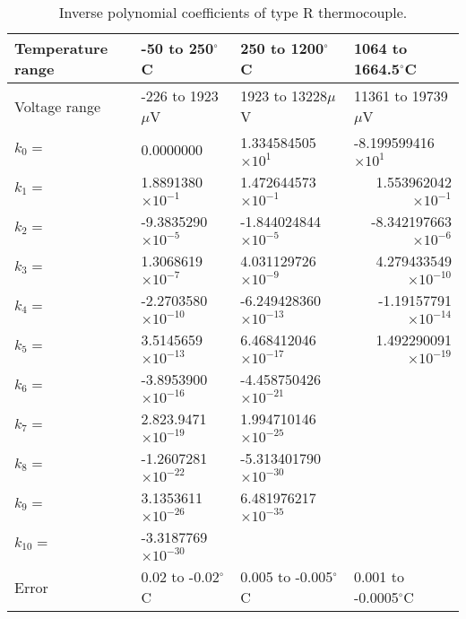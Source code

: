 \begin{table}[ht]
  \centering
  \small
  \caption{Inverse polynomial coefficients of type R thermocouple.}
    \begin{tabular}{lllr}
    \toprule
    Temperature range & -50 to 250$^{\circ}$C & 250 to 1200$^{\circ}$C & \multicolumn{1}{l}{1064 to 1664.5$^{\circ}$C} \\
    \midrule
    Voltage range & -226 to 1923$\mu$V & 1923 to 13228$\mu$V & \multicolumn{1}{l}{11361 to 19739$\mu$V} \\
    \midrule
    $k_{0}=$ & 0.0000000 & 1.334584505$\times 10^{1}$ & \multicolumn{1}{l}{-8.199599416$\times 10^{1}$} \\
    $k_{1}=$ & 1.8891380$\times 10^{-1}$ & 1.472644573$\times 10^{-1}$ & 1.553962042$\times 10^{-1}$ \\
    $k_{2}=$ & -9.3835290$\times 10^{-5}$ & -1.844024844$\times 10^{-5}$ & -8.342197663$\times 10^{-6}$ \\
    $k_{3}=$ & 1.3068619$\times 10^{-7}$ & 4.031129726$\times 10^{-9}$ & 4.279433549$\times 10^{-10}$ \\
    $k_{4}=$ & -2.2703580$\times 10^{-10}$ & -6.249428360$\times 10^{-13}$ & -1.19157791$\times 10^{-14}$ \\
    $k_{5}=$ & 3.5145659$\times 10^{-13}$ & 6.468412046$\times 10^{-17}$ & 1.492290091$\times 10^{-19}$ \\
    $k_{6}=$ & -3.8953900$\times 10^{-16}$ & -4.458750426$\times 10^{-21}$ & \multicolumn{1}{l}{} \\
    $k_{7}=$ & 2.823.9471$\times 10^{-19}$ & 1.994710146$\times 10^{-25}$ & \multicolumn{1}{l}{} \\
    $k_{8}=$ & -1.2607281$\times 10^{-22}$ & -5.313401790$\times 10^{-30}$ & \multicolumn{1}{l}{} \\
    $k_{9}=$ & 3.1353611$\times 10^{-26}$ & 6.481976217$\times 10^{-35}$ & \multicolumn{1}{l}{} \\
    $k_{10}=$ & -3.3187769$\times 10^{-30}$ &       & \multicolumn{1}{l}{} \\
    \midrule
    Error & 0.02 to -0.02$^{\circ}$C & 0.005 to -0.005$^{\circ}$C & \multicolumn{1}{l}{0.001 to -0.0005$^{\circ}$C} \\
    \bottomrule
    \end{tabular}%
  \label{tab:TypeRInversePolynomial}%
\end{table}%

